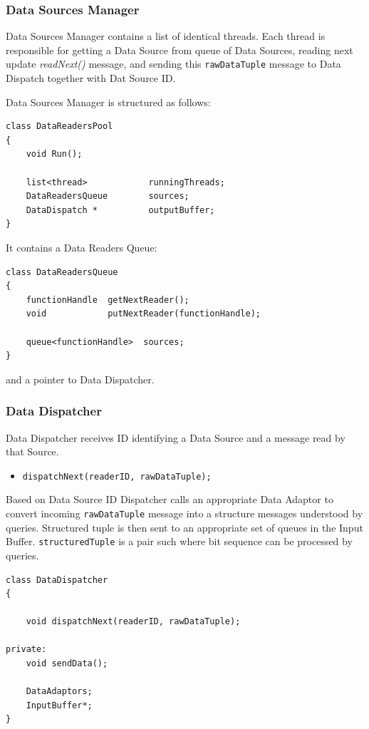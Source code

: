 \documentclass[14pt]{article}
\begin{document}
\subsubsection{Data Sources Manager}

Data Sources Manager contains a list of identical threads. Each thread is responsible for getting a Data Source from queue of Data Sources, reading next update \emph{readNext()} message, and sending this {\tt rawDataTuple} message to Data Dispatch together with Dat Source ID.

Data Sources Manager is structured as follows:
\begin{verbatim}
class DataReadersPool
{
	void Run();
	
    list<thread>            runningThreads;
    DataReadersQueue        sources;
    DataDispatch *          outputBuffer;
}
\end{verbatim}

\noindent It contains a Data Readers Queue:

\begin{verbatim}
class DataReadersQueue
{
	functionHandle  getNextReader();
	void            putNextReader(functionHandle);
	
    queue<functionHandle>  sources;
}
\end{verbatim}

\noindent and a pointer to Data Dispatcher.

\subsubsection{Data Dispatcher}

Data Dispatcher receives ID identifying a Data Source and a message read by that Source. 

\begin{itemize}
	\item {\tt dispatchNext(readerID, rawDataTuple);}
\end{itemize}

Based on Data Source ID Dispatcher calls an appropriate Data Adaptor to convert incoming {\tt rawDataTuple} message into a structure messages understood by queries. Structured tuple is then sent to an appropriate set of queues in the Input Buffer. {\tt structuredTuple} is a pair {\tt <size, bit-sequence>} such where bit sequence can be processed by queries. 

\begin{verbatim}
class DataDispatcher
{
	
    void dispatchNext(readerID, rawDataTuple);

private:
    void sendData();
	
    DataAdaptors;
    InputBuffer*;
}
\end{verbatim}
\end{document}
